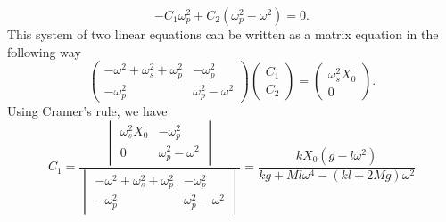 \documentclass[12pt,a4paper]{article}
\begin{document}
\begin{equation}
    -C_1\omega_p^2+C_2\left(\omega_p^2-\omega^2\right)=0.
\end{equation}
This system of two linear equations can be written as a matrix equation in the following way
\begin{equation}
    \begin{pmatrix}
        -\omega^2+\omega_s^2+\omega_p^2 & -\omega_p^2 \\
        -\omega_p^2 & \omega_p^2-\omega^2
    \end{pmatrix}
    \begin{pmatrix}
        C_1 \\
        C_2
    \end{pmatrix}=
    \begin{pmatrix}
        \omega_s^2X_0 \\
        0
    \end{pmatrix}.
\end{equation}
Using Cramer's rule, we have
\begin{equation}
    C_1=\frac{\begin{vmatrix}
         \omega_s^2X_0 & -\omega_p^2 \\
        0 & \omega_p^2-\omega^2
    \end{vmatrix}}{\begin{vmatrix}
        -\omega^2+\omega_s^2+\omega_p^2 & -\omega_p^2 \\
        -\omega_p^2 & \omega_p^2-\omega^2
    \end{vmatrix}}=\frac{kX_0\left(g-l\omega^2\right)}{kg+Ml\omega^4-(kl+2Mg)\omega^2}
\end{equation}
\end{document}
